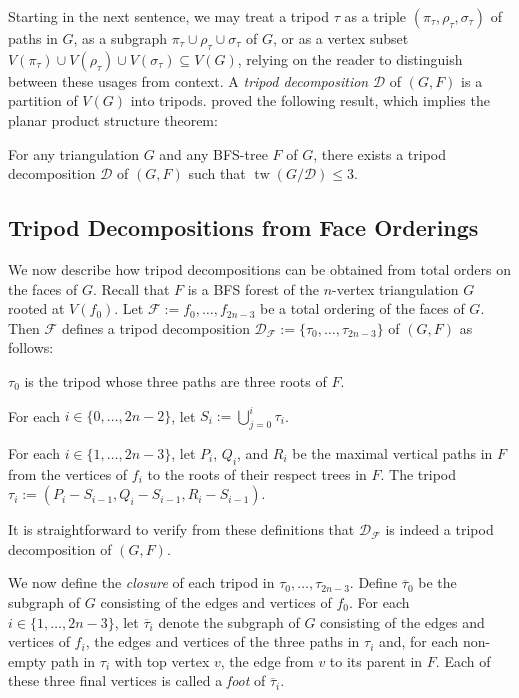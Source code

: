 \documentclass{patmorin}
\DeclareMathOperator{\tw}{tw}
\begin{document}
Starting in the next sentence, we may treat a tripod $\tau$ as a triple $(\pi_\tau,\rho_\tau,\sigma_\tau)$ of paths  in $G$, as a subgraph $\pi_\tau\cup\rho_\tau\cup\sigma_\tau$ of $G$, or as a vertex subset $V(\pi_\tau)\cup V(\rho_\tau)\cup V(\sigma_\tau)\subseteq V(G)$, relying on the reader to distinguish between these usages from context.  A \emph{tripod decomposition} $\mathcal{D}$ of $(G,F)$ is a partition of $V(G)$ into tripods.  \citet{dujmovic.joret.ea:planar} proved the following result, which implies the planar product structure theorem:

\begin{thm}\label{tripod_decomposition}
  For any triangulation $G$ and any BFS-tree $F$ of $G$, there exists a tripod decomposition $\mathcal{D}$ of $(G,F)$ such that $\tw(G/\mathcal{D})\le 3$.
\end{thm}

\subsection{Tripod Decompositions from Face Orderings}

We now describe how tripod decompositions can be obtained from total orders on the faces of $G$.  Recall that $F$ is a BFS forest of the $n$-vertex triangulation $G$ rooted at $V(f_0)$.  Let $\mathcal{F}:=f_0,\ldots,f_{2n-3}$ be a total ordering of the faces of $G$.  Then $\mathcal{F}$ defines a tripod decomposition $\mathcal{D}_\mathcal{F}:=\{\tau_0,\ldots,\tau_{2n-3}\}$ of $(G,F)$ as follows:
\begin{compactenum}
  \item $\tau_0$ is the tripod whose three paths are three roots of $F$.
  \item For each $i\in\{0,\ldots,2n-2\}$, let $S_i:=\bigcup_{j=0}^i \tau_i$.
  \item For each $i\in\{1,\ldots,2n-3\}$, let $P_i$, $Q_i$, and $R_i$ be the maximal vertical paths in $F$ from the vertices of $f_i$ to the roots of their respect trees in $F$.  The tripod $\tau_i:=(P_i-S_{i-1},Q_i-S_{i-1},R_i-S_{i-1})$.
\end{compactenum}
It is straightforward to verify from these definitions that $\mathcal{D}_\mathcal{F}$ is indeed a tripod decomposition of $(G,F)$.

We now define the \emph{closure} of each tripod in $\tau_0,\ldots,\tau_{2n-3}$.  Define $\overline{\tau}_0$ be the subgraph of $G$ consisting of the edges and vertices of $f_0$.  For each $i\in\{1,\ldots,2n-3\}$, let $\overline{\tau}_i$ denote the subgraph of $G$ consisting of the edges and vertices of $f_i$, the edges and vertices of the three paths in $\tau_i$ and, for each non-empty path in $\tau_i$ with top vertex $v$, the edge from $v$ to its parent in $F$.  Each of these three final vertices is called a \emph{foot} of $\overline{\tau}_i$.
\end{document}
